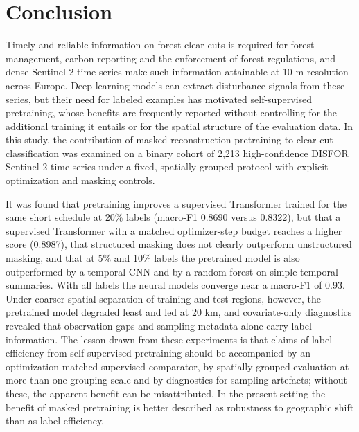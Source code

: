 \documentclass[11pt,a4paper]{article}
\begin{document}
\section{Conclusion}
Timely and reliable information on forest clear cuts is required for forest management, carbon reporting and the enforcement of forest regulations, and dense Sentinel-2 time series make such information attainable at 10 m resolution across Europe. Deep learning models can extract disturbance signals from these series, but their need for labeled examples has motivated self-supervised pretraining, whose benefits are frequently reported without controlling for the additional training it entails or for the spatial structure of the evaluation data. In this study, the contribution of masked-reconstruction pretraining to clear-cut classification was examined on a binary cohort of 2,213 high-confidence DISFOR Sentinel-2 time series under a fixed, spatially grouped protocol with explicit optimization and masking controls.

It was found that pretraining improves a supervised Transformer trained for the same short schedule at 20\% labels (macro-F1 0.8690 versus 0.8322), but that a supervised Transformer with a matched optimizer-step budget reaches a higher score (0.8987), that structured masking does not clearly outperform unstructured masking, and that at 5\% and 10\% labels the pretrained model is also outperformed by a temporal CNN and by a random forest on simple temporal summaries. With all labels the neural models converge near a macro-F1 of 0.93. Under coarser spatial separation of training and test regions, however, the pretrained model degraded least and led at 20 km, and covariate-only diagnostics revealed that observation gaps and sampling metadata alone carry label information. The lesson drawn from these experiments is that claims of label efficiency from self-supervised pretraining should be accompanied by an optimization-matched supervised comparator, by spatially grouped evaluation at more than one grouping scale and by diagnostics for sampling artefacts; without these, the apparent benefit can be misattributed. In the present setting the benefit of masked pretraining is better described as robustness to geographic shift than as label efficiency.
\end{document}

